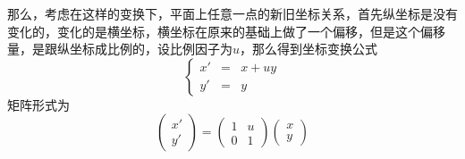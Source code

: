 那么，考虑在这样的变换下，平面上任意一点的新旧坐标关系，首先纵坐标是没有变化的，变化的是横坐标，横坐标在原来的基础上做了一个偏移，但是这个偏移量，是跟纵坐标成比例的，设比例因子为$u$，那么得到坐标变换公式
\begin{equation}
  \label{eq:scale-translation-coordinate-formula-2}
  \left\{
    \begin{array}{ccc}
      x' & = &  x + uy \\
      y' & = &  y
    \end{array}
  \right.
\end{equation}
矩阵形式为
\begin{equation*}
  \left(
    \begin{array}{c}
      x' \\
      y'
    \end{array}
  \right)
    =
    \left(
      \begin{array}{cc}
        1 & u \\
        0 & 1
      \end{array}
    \right)
  \left(
    \begin{array}{c}
      x \\
      y
    \end{array}
  \right)
\end{equation*}

